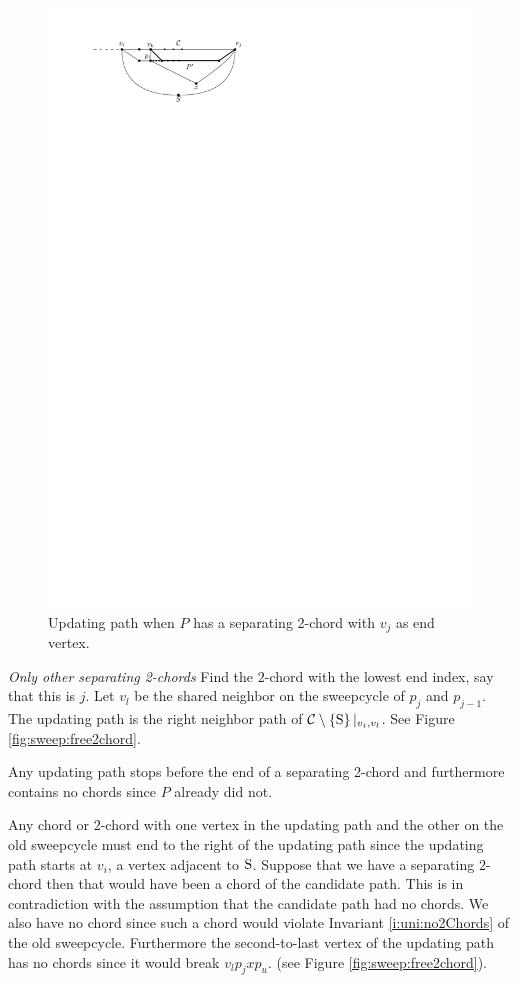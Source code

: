     \begin{figure}[h]
      \centering
      \includegraphics[scale=1]{unifiedAlgo/img/sweep/cases/pEBound}
      \caption{Updating path when $P$ has a separating 2-chord with $v_j$ as end vertex.}
      \label{fig:sweep:pEBound}
    \end{figure}

    \emph{Only other separating 2-chords}
      Find the $2$-chord with the lowest end index, say that this is $j$.
      Let $v_l$ be the shared neighbor on the sweepcycle of $p_{j}$ and $p_{j-1}$.
      The updating path is the right neighbor path of $\mathcal{C} \setminus \left\lbrace {\mathrm{S}} \right\rbrace|_{v_i, v_l}$. See Figure \ref{fig:sweep:free2chord}.

      Any updating path stops before the end of a separating 2-chord and furthermore contains no chords since $P$ already did not.

      Any chord or $2$-chord with one vertex in the updating path and the other on the old sweepcycle must end to the right of the updating path since the updating path starts at $v_i$, a vertex adjacent to $\mathrm{S}$.
      Suppose that we have a separating $2$-chord then that would have been a chord of the candidate path. This is in contradiction with the assumption that the candidate path had no chords.
      We also have no chord since such a chord would violate Invariant \ref{i:uni:no2Chords} of the old sweepcycle. Furthermore the second-to-last vertex of the updating path has no chords since it would break $v_l p_j x p_u$. (see Figure \ref{fig:sweep:free2chord}).

